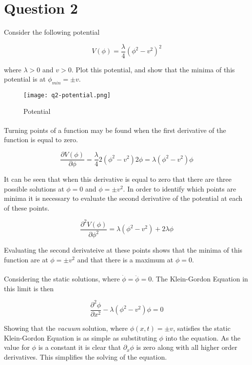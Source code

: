 \section{Question 2}
\paragraph{}
Consider the following potential

$$
	V(\phi) = \frac{\lambda}{4}(\phi^2 - v^2)^2
$$

where $\lambda > 0$ and $v > 0$. Plot this potential, and show that the minima of this potential is at $\phi_{min}=\pm v$.

\begin{figure}[H]
    \centering
    \texttt{[image: q2-potential.png]}
    \caption{Potential}
    \label{fig:q2-potential}
\end{figure}
%
\paragraph{}
Turning points of a function may be found when the first derivative of the function is equal to zero.

$$
	\frac{\partial V(\phi) } {\partial \phi}
	= \frac{\lambda}{4} 2 (\phi^2 - v^{2}) 2 \phi
	= \lambda (\phi^2 - v^{2}) \phi
$$

It can be seen that when this derivative is equal to zero that there are three possible solutions at $\phi=0$ and $\phi=\pm v^{2}$.  In order to identify which points are minima it is necessary to evaluate the second derivative of the potential at each of these points.

$$
	\frac{\partial ^2 V(\phi) } {\partial \phi ^2}
	= \lambda (\phi^{2} - v^{2}) + 2 \lambda \phi
$$

Evaluating the second derivateive at these points shows that the minima of this function are at $\phi=\pm v^{2}$ and that there is a maximum at $\phi=0$.


\paragraph{}
Considering the static solutions, where $\dot{\phi} = \ddot{\phi} = 0$. The Klein-Gordon Equation in this limit is then

$$
	\frac{\partial ^2 \phi } {\partial x^2} - \lambda (\phi ^{2} - v^{2})\phi = 0
$$

Showing that the \textit{vacuum} solution, where $\phi(x,t) = \pm v$, satisfies the static Klein-Gordon Equation is as simple as substituting $\phi$ into the equation.  As the value for $\phi$ is a constant it is clear that $\partial_x \phi$ is zero along with all higher order derivatives.  This simplifies the solving of the equation.

